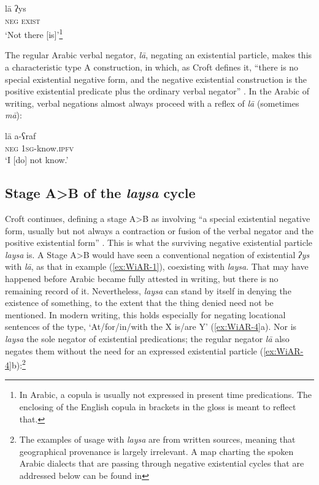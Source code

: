 \documentclass[output=paper]{langsci/langscibook}
\begin{document}
\ea \label{ex:WiAR-2}
	\gll lā ʔys\\
	\textsc{neg} \textsc{exist}\\
	\glt `Not there [is]’\footnote{In Arabic, a copula is usually not expressed in present time predications. The enclosing of the English copula in brackets in the gloss is meant to reflect that. } \citep[105]{al-far2003a}
\z

The regular Arabic verbal negator, \textit{lā}, negating an existential particle, makes this a characteristic type A construction, in which, as Croft defines it, “there is no special existential negative form, and the negative existential construction is the positive existential predicate plus the ordinary verbal negator” \citeyearpar[6--7]{Croft1991}. In the Arabic of writing, verbal negations almost always proceed with a reflex of \textit{lā} (sometimes \textit{mā}):

\ea \label{ex:WiAR-3}
	\gll lā a-ʕraf \\
	\textsc{neg} \textsc{1sg}-know.\textsc{ipfv} \\
	\glt ‘I [do] not know.’ \citep[144, 158]{adwan2000a}
\z

\subsection{Stage A>B of the \textit{laysa} cycle} \label{s:WiAR-2.1}

Croft continues, defining a stage A>B as involving “a special existential negative form, usually but not always a contraction or fusion of the verbal negator and the positive existential form” \citeyearpar[7]{Croft1991}. This is what the surviving negative existential particle \textit{laysa} is. A Stage A>B would have seen a conventional negation of existential \textit{ʔys} with \textit{lā}, as that in example (\ref{ex:WiAR-1}), coexisting with \textit{laysa}. That may have happened before Arabic became fully attested in writing, but there is no remaining record of it. Nevertheless, \textit{laysa} can stand by itself in denying the existence of something, to the extent that the thing denied need not be mentioned. In modern writing, this holds especially for negating locational sentences of the type, ‘At/for/in/with the X is/are Y’ (\ref{ex:WiAR-4}a). Nor is \textit{laysa} the sole negator of existential predications; the regular negator \textit{lā} also negates them without the need for an expressed existential particle (\ref{ex:WiAR-4}b):\footnote{The examples of usage with \textit{laysa} are from written sources, meaning that geographical provenance is largely irrelevant. A map charting the spoken Arabic dialects that are passing through negative existential cycles that are addressed below can be found in }
\end{document}
